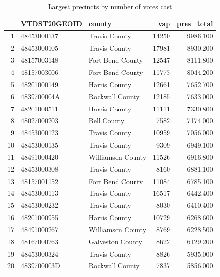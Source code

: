\begin{table}[ht]
\centering
\begin{tabular}{rllrr}
  \hline
 & VTDST20GEOID & county & vap & pres\_total \\ 
  \hline
1 & 48453000137 & Travis County & 14250 & 9986.100 \\ 
  2 & 48453000105 & Travis County & 17981 & 8930.200 \\ 
  3 & 48157003148 & Fort Bend County & 12547 & 8111.800 \\ 
  4 & 48157003006 & Fort Bend County & 11773 & 8044.200 \\ 
  5 & 48201000149 & Harris County & 12661 & 7652.700 \\ 
  6 & 4839700004A & Rockwall County & 12185 & 7633.000 \\ 
  7 & 48201000511 & Harris County & 11111 & 7330.800 \\ 
  8 & 48027000203 & Bell County & 7582 & 7174.000 \\ 
  9 & 48453000123 & Travis County & 10959 & 7056.000 \\ 
  10 & 48453000135 & Travis County & 9309 & 6949.100 \\ 
  11 & 48491000420 & Williamson County & 11526 & 6916.800 \\ 
  12 & 48453000308 & Travis County & 8160 & 6881.100 \\ 
  13 & 48157001152 & Fort Bend County & 11084 & 6785.100 \\ 
  14 & 48453000113 & Travis County & 16517 & 6442.400 \\ 
  15 & 48453000232 & Travis County & 8030 & 6410.400 \\ 
  16 & 48201000955 & Harris County & 10729 & 6268.600 \\ 
  17 & 48491000267 & Williamson County & 8769 & 6228.500 \\ 
  18 & 48167000263 & Galveston County & 8622 & 6129.200 \\ 
  19 & 48453000324 & Travis County & 8826 & 5935.000 \\ 
  20 & 4839700003D & Rockwall County & 7837 & 5856.000 \\ 
   \hline
\end{tabular}
\caption{Largest precincts by number of votes cast} 
\label{tab:bounded-n}
\end{table}
